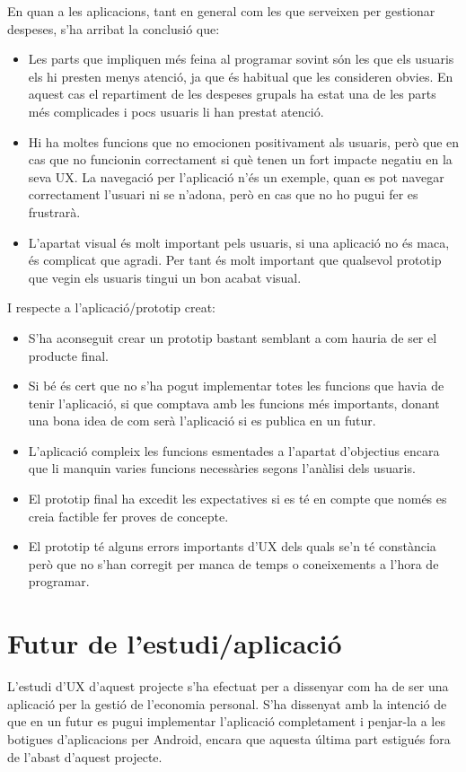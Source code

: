 En quan a les aplicacions, tant en general com les que serveixen per gestionar despeses, s'ha arribat la conclusió que:

\begin{itemize}
\item Les parts que impliquen més feina al programar sovint són les que els usuaris els hi presten menys atenció, ja que és habitual que les consideren obvies. En aquest cas el repartiment de les despeses grupals ha estat una de les parts més complicades i pocs usuaris li han prestat atenció.
\item Hi ha moltes funcions que no emocionen positivament als usuaris, però que en cas que no funcionin correctament si què tenen un fort impacte negatiu en la seva \ac{UX}. La navegació per l'aplicació n'és un exemple, quan es pot navegar correctament l'usuari ni se n'adona, però en cas que no ho pugui fer es frustrarà.
\item L'apartat visual és molt important pels usuaris, si una aplicació no és maca, és complicat que agradi. Per tant és molt important que qualsevol prototip que vegin els usuaris tingui un bon acabat visual. 
\end{itemize}

I respecte a l'aplicació/prototip creat:

\begin{itemize}
\item S'ha aconseguit crear un prototip bastant semblant a com hauria de ser el producte final.
\item Si bé és cert que no s'ha pogut implementar totes les funcions que havia de tenir l'aplicació, si que comptava amb les funcions més importants, donant una bona idea de com serà l'aplicació si es publica en un futur. %
\item L'aplicació compleix les funcions esmentades a l'apartat d'objectius encara que li manquin varies funcions necessàries segons l'anàlisi dels usuaris.
\item El prototip final ha excedit les expectatives si es té en compte que només es creia factible fer proves de concepte.
\item El prototip té alguns errors importants d'\ac{UX} dels quals se'n té constància però que no s'han corregit per manca de temps o coneixements a l'hora de programar. %
\end{itemize}

\section{Futur de l'estudi/aplicació}
L'estudi d'\ac{UX} d'aquest projecte s'ha efectuat per a dissenyar com ha de ser una aplicació per la gestió de l'economia personal. S'ha dissenyat amb la intenció de que en un futur es pugui implementar l'aplicació completament i penjar-la a les botigues d'aplicacions per \gls{Android}, encara que aquesta última part estigués fora de l'abast d'aquest projecte. 

